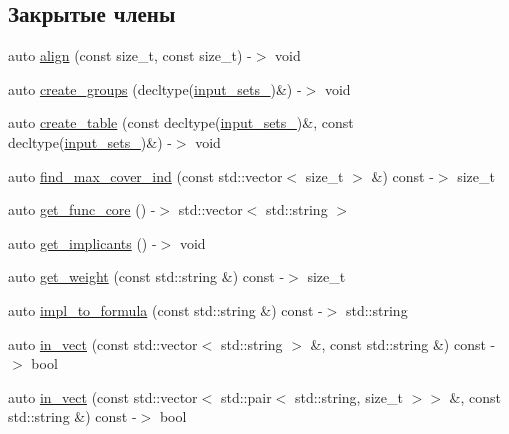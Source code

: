 \subsection*{Закрытые члены}
\begin{DoxyCompactItemize}
\item 
auto \hyperlink{class_quine___mc_cluskey___simplifier_a2ea987ae19995489fc4660fc1d7c6597}{align} (const size\+\_\+t, const size\+\_\+t) -\/$>$ void
\item 
auto \hyperlink{class_quine___mc_cluskey___simplifier_a5451d28899fae1e5168a674698c2c3a9}{create\+\_\+groups} (decltype(\hyperlink{class_quine___mc_cluskey___simplifier_aa71e3ddeed1fa47b711399acb5c11ab8}{input\+\_\+sets\+\_\+})\&) -\/$>$ void
\item 
auto \hyperlink{class_quine___mc_cluskey___simplifier_ac86d667024cb8b8ef2c1da54aa64f4a1}{create\+\_\+table} (const decltype(\hyperlink{class_quine___mc_cluskey___simplifier_aa71e3ddeed1fa47b711399acb5c11ab8}{input\+\_\+sets\+\_\+})\&, const decltype(\hyperlink{class_quine___mc_cluskey___simplifier_aa71e3ddeed1fa47b711399acb5c11ab8}{input\+\_\+sets\+\_\+})\&) -\/$>$ void
\item 
auto \hyperlink{class_quine___mc_cluskey___simplifier_a5e5e84b83cd60163086754e4a7e3b60a}{find\+\_\+max\+\_\+cover\+\_\+ind} (const std\+::vector$<$ size\+\_\+t $>$ \&) const -\/$>$ size\+\_\+t
\item 
auto \hyperlink{class_quine___mc_cluskey___simplifier_a5e6b546c90636c4125031981900b55e3}{get\+\_\+func\+\_\+core} () -\/$>$ std\+::vector$<$ std\+::string $>$
\item 
auto \hyperlink{class_quine___mc_cluskey___simplifier_aa94d0249575bd1364924b6fe0126ac43}{get\+\_\+implicants} () -\/$>$ void
\item 
auto \hyperlink{class_quine___mc_cluskey___simplifier_a5018ba24540f09412e732d296fb677a3}{get\+\_\+weight} (const std\+::string \&) const -\/$>$ size\+\_\+t
\item 
auto \hyperlink{class_quine___mc_cluskey___simplifier_a590ddbe7572a376f5b206520626b6b64}{impl\+\_\+to\+\_\+formula} (const std\+::string \&) const -\/$>$ std\+::string
\item 
auto \hyperlink{class_quine___mc_cluskey___simplifier_a88ed9e2cb9361a1dcbbf2440c0e64adc}{in\+\_\+vect} (const std\+::vector$<$ std\+::string $>$ \&, const std\+::string \&) const -\/$>$ bool
\item 
auto \hyperlink{class_quine___mc_cluskey___simplifier_a802a841cc25d859e77987516aa80e03c}{in\+\_\+vect} (const std\+::vector$<$ std\+::pair$<$ std\+::string, size\+\_\+t $>$$>$ \&, const std\+::string \&) const -\/$>$ bool
$$
\end{DoxyCompactItemize}
